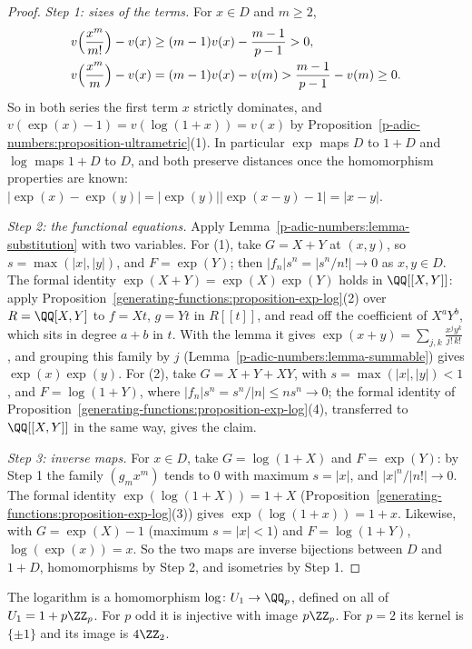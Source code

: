 \begin{proof}
\emph{Step 1: sizes of the terms.} For $x \in D$ and $m \geq 2$,
\[
\begin{aligned}
v\Bigl(\frac{x^m}{m!}\Bigr) - v(x) &\geq (m - 1)v(x) - \frac{m - 1}{p - 1} > 0, \\
v\Bigl(\frac{x^m}{m}\Bigr) - v(x) &= (m - 1)v(x) - v(m) > \frac{m - 1}{p - 1} - v(m) \geq 0 .
\end{aligned}
\]
So in both series the first term $x$ strictly dominates, and $v(\exp(x) - 1) = v(\log(1 + x)) = v(x)$ by Proposition~\ref{p-adic-numbers:proposition-ultrametric}(1). In particular $\exp$ maps $D$ to $1 + D$ and
$\log$ maps $1 + D$ to $D$, and both preserve distances once the homomorphism properties are known: $|\exp(x) - \exp(y)| = |\exp(y)||\exp(x - y) - 1| = |x - y|$.

\emph{Step 2: the functional equations.} Apply Lemma~\ref{p-adic-numbers:lemma-substitution} with two variables. For (1), take $G = X + Y$ at $(x, y)$, so $s = \max(|x|, |y|)$, and $F = \exp(Y)$; then
$|f_n|s^n = |s^n/n!| \to 0$ as $x, y \in D$. The formal identity $\exp(X + Y) = \exp(X)\exp(Y)$ holds in $\QQ[[X, Y]]$: apply Proposition~\ref{generating-functions:proposition-exp-log}(2) over $R = \QQ[X, Y]$ to $f = Xt$, $g = Yt$ in $R[[t]]$, and
read off the coefficient of $X^aY^b$, which sits in degree $a + b$ in $t$. With the lemma it gives
$\exp(x + y) = \sum_{j, k}\frac{x^jy^k}{j!\,k!}$, and grouping this family by $j$ (Lemma~\ref{p-adic-numbers:lemma-summable}) gives $\exp(x)\exp(y)$. For (2), take $G = X + Y + XY$, with
$s = \max(|x|, |y|) < 1$, and $F = \log(1 + Y)$, where $|f_n|s^n = s^n/|n| \leq ns^n \to 0$; the formal identity of Proposition~\ref{generating-functions:proposition-exp-log}(4), transferred to $\QQ[[X, Y]]$ in the same way, gives the claim.

\emph{Step 3: inverse maps.} For $x \in D$, take $G = \log(1 + X)$ and $F = \exp(Y)$: by Step 1 the family $(g_mx^m)$ tends to $0$ with maximum $s = |x|$, and $|x|^n/|n!| \to 0$. The formal identity
$\exp(\log(1 + X)) = 1 + X$ (Proposition~\ref{generating-functions:proposition-exp-log}(3)) gives $\exp(\log(1 + x)) = 1 + x$. Likewise, with $G = \exp(X) - 1$ (maximum $s = |x| < 1$) and
$F = \log(1 + Y)$, $\log(\exp(x)) = x$. So the two maps are inverse bijections between $D$ and $1 + D$, homomorphisms by Step 2, and isometries by Step 1.
\end{proof}

\begin{corollary}\label{p-adic-numbers:corollary-log-kernel}
The logarithm is a homomorphism $\log \colon U_1 \to \QQ_p$, defined on all of $U_1 = 1 + p\ZZ_p$. For $p$ odd it is injective with image $p\ZZ_p$. For $p = 2$ its kernel is $\{\pm1\}$ and its image is
$4\ZZ_2$.
\end{corollary}


